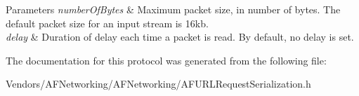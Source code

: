 \begin{DoxyParams}{Parameters}
{\em number\+Of\+Bytes} & Maximum packet size, in number of bytes. The default packet size for an input stream is 16kb. \\
\hline
{\em delay} & Duration of delay each time a packet is read. By default, no delay is set. \\
\hline
\end{DoxyParams}


The documentation for this protocol was generated from the following file\+:\begin{DoxyCompactItemize}
\item 
Vendors/\+A\+F\+Networking/\+A\+F\+Networking/A\+F\+U\+R\+L\+Request\+Serialization.\+h\end{DoxyCompactItemize}
